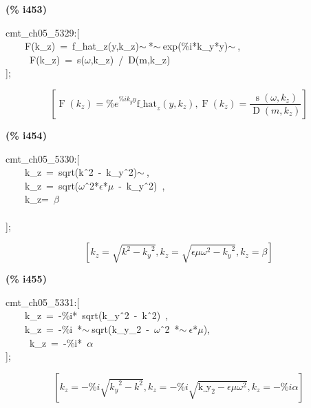\documentclass[fleqn]{article}
\begin{document}
\noindent
\begin{minipage}[t]{4.000000em}\color{red}\bfseries
(\% i453)	
\end{minipage}
\begin{minipage}[t]{\textwidth}\color{blue}
cmt\_ch05\_5329:[\\
\ \ \ \ F(k\_z)\ =\ f\_hat\_z(y,k\_z)\ensuremath{\sim\ }*\ensuremath{\sim\ }exp(\%i*k\_y*y)\ensuremath{\sim\ },\\
\ \ \ \ \ F(k\_z)\ =\ s(\ensuremath{\omega},k\_z)\ /\ D(m,k\_z)\\
];
\end{minipage}
\[\displaystyle \tag{\% o453} 
\left[ \operatorname{F}\left( {k_z}\right) ={{\% e}^{\% i {k_y} y}} {{\ensuremath{\mathrm{f\_ hat}}}_z}\left( y\operatorname{,}{k_z}\right) \operatorname{,}\operatorname{F}\left( {k_z}\right) =\frac{\operatorname{s}\left( \omega \operatorname{,}{k_z}\right) }{\operatorname{D}\left( m\operatorname{,}{k_z}\right) }\right] \mbox{}
\]


\noindent
\begin{minipage}[t]{4.000000em}\color{red}\bfseries
(\% i454)	
\end{minipage}
\begin{minipage}[t]{\textwidth}\color{blue}
cmt\_ch05\_5330:[\\
\ \ \ \ k\_z\ =\ sqrt(k\^\ 2\ -\ k\_y\^\ 2)\ensuremath{\sim\ },\\
\ \ \ \ k\_z\ =\ sqrt(\ensuremath{\omega}\^\ 2*\ensuremath{\epsilon}*\ensuremath{\mu}\ -\ k\_y\^\ 2)\ ,\\
\ \ \ \ k\_z=\ \ensuremath{\beta}\\
\\
];
\end{minipage}
\[\displaystyle \tag{\% o454} 
\left[ {k_z}=\sqrt{{{k}^{2}}-{{{k_y}}^{2}}}\operatorname{,}{k_z}=\sqrt{\epsilon  \mu  {{\omega }^{2}}-{{{k_y}}^{2}}}\operatorname{,}{k_z}=\beta \right] \mbox{}
\]


\noindent
\begin{minipage}[t]{4.000000em}\color{red}\bfseries
(\% i455)	
\end{minipage}
\begin{minipage}[t]{\textwidth}\color{blue}
cmt\_ch05\_5331:[\\
\ \ \ \ k\_z\ =\ -\%i*\ sqrt(k\_y\^\ 2\ -\ k\^\ 2)\ ,\\
\ \ \ \ k\_z\ =\ -\%i\ *\ensuremath{\sim\ }sqrt(k\_y\_2\ -\ \ensuremath{\omega}\^\ 2\ *\ensuremath{\sim\ }\ensuremath{\epsilon}*\ensuremath{\mu}),\\
\ \ \ \ \ k\_z\ =\ -\%i*\ \ensuremath{\alpha}\\
];
\end{minipage}
\[\displaystyle \tag{\% o455} 
\left[ {k_z}=-\% i \sqrt{{{{k_y}}^{2}}-{{k}^{2}}}\operatorname{,}{k_z}=-\% i \sqrt{{{\ensuremath{\mathrm{k\_ y}}}_2}-\epsilon  \mu  {{\omega }^{2}}}\operatorname{,}{k_z}=-\% i \alpha \right] \mbox{}
\]
\end{document}
